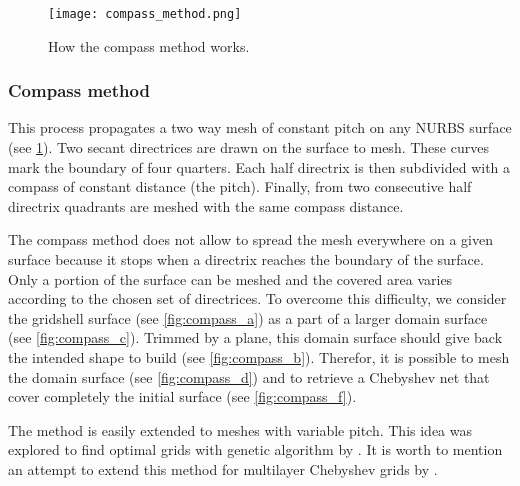 \begin{figure}[h]
	\centering
	\texttt{[image: compass\_method.png]}
	\caption[How the compass method works]{How the compass method works.}
	\label{fig:compass_method}
\end{figure}

\subsubsection{Compass method}\label{sec:compass}
This process propagates a two way mesh of constant pitch on any NURBS surface (see \cref{fig:compass_method}). Two secant directrices are drawn on the surface to mesh. These curves mark the boundary of four quarters. Each half directrix is then subdivided with a compass of constant distance (the pitch). Finally, from two consecutive half directrix quadrants are meshed with the same compass distance.

The compass method does not allow to spread the mesh everywhere on a given surface because it stops when a directrix reaches the boundary of the surface. Only a portion of the surface can be meshed and the covered area varies according to the chosen set of directrices. To overcome this difficulty, we consider the gridshell surface (see \cref{fig:compass_a}) as a part of a larger domain surface (see \cref{fig:compass_c}). Trimmed by a plane, this domain surface should give back the intended shape to build (see \cref{fig:compass_b}). Therefor, it is possible to mesh the domain surface (see \cref{fig:compass_d}) and to retrieve a Chebyshev net that cover completely the initial surface (see \cref{fig:compass_f}).

The method is easily extended to meshes with variable pitch. This idea was explored to find optimal grids with genetic algorithm by \citet{Bouhaya2014}. It is worth to mention an attempt to extend this method for multilayer Chebyshev grids by \citet{Lefevre2015}.

